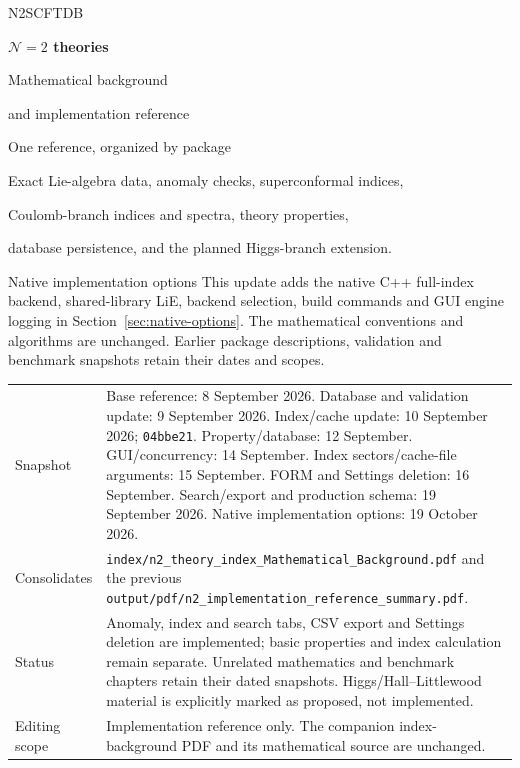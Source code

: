 \documentclass[11pt,a4paper]{article}
\numberwithin{equation}{section}
\newcommand{\code}[1]{{\small\nolinkurl{#1}}}
\begin{document}
\hypersetup{pageanchor=false}
\begin{titlepage}
\vspace*{13mm}
{\sffamily\color{accent}\large N2SCFTDB}\par
\vspace{10mm}
{\sffamily\bfseries\color{ink}\Huge $\mathcal N=2$ theories}\par
\vspace{5mm}
{\sffamily\color{ink}\LARGE Mathematical background\par and implementation reference}\par
\vspace{12mm}
{\Large One reference, organized by package}\par
\vspace{6mm}
Exact Lie-algebra data, anomaly checks, superconformal indices,\par
Coulomb-branch indices and spectra, theory properties,\par
database persistence, and the planned Higgs-branch extension.
\vspace{11mm}
\begin{note}{Native implementation options}
This update adds the native C++ full-index backend, shared-library LiE,
backend selection, build commands and GUI engine logging in
Section~\ref{sec:native-options}. The mathematical conventions and algorithms
are unchanged. Earlier package descriptions, validation and benchmark
snapshots retain their dates and scopes.
\end{note}
\vfill
\begin{tabularx}{\textwidth}{@{}p{31mm}Y@{}}
Snapshot & Base reference: 8 September 2026. Database and validation update:
9 September 2026. Index/cache update: 10 September 2026; \code{04bbe21}.
Property/database: 12 September. GUI/concurrency: 14 September.
Index sectors/cache-file arguments: 15 September. FORM and Settings deletion:
16 September. Search/export and production schema: 19 September 2026.
Native implementation options: 19 October 2026.\\
Consolidates & \code{index/n2_theory_index_Mathematical_Background.pdf}\newline
and the previous \code{output/pdf/n2_implementation_reference_summary.pdf}.\\
Status & Anomaly, index and search tabs, CSV export and Settings deletion are implemented;
basic properties and index calculation remain separate.
Unrelated mathematics and benchmark chapters retain their dated snapshots.
Higgs/Hall--Littlewood material is explicitly marked as proposed, not implemented.\\
Editing scope & Implementation reference only. The companion index-background
PDF and its mathematical source are unchanged.\\
\end{tabularx}
\end{titlepage}
\hypersetup{pageanchor=true}
\end{document}
